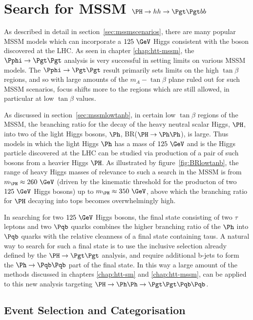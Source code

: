 \chapter{Search for MSSM $\PH \to hh \to \Pgt\Pgt bb$}
\label{chap:Hhh}

As described in detail in section~\ref{sec:mssmscenarios}, there are many popular
\ac{MSSM} models which can incorporate a $125~\GeV$ Higgs consistent with the boson
discovered at the LHC. As seen in chapter \ref{chap:htt-mssm}, the 
$\Pphi \to \Pgt\Pgt$ analysis is very successful in 
setting limits on various \ac{MSSM} models. The $\Pphi \to \Pgt \Pgt$ result primarily sets
limits on the high $\tan\beta$ regions, and so with large amounts of the
$m_{A}-\tan\beta$ plane ruled out for such \ac{MSSM} scenarios, focus shifts more 
to the regions which are still allowed, in particular at low $\tan\beta$ values.

As discussed in section~\ref{sec:mssmlowtanb}, in certain low $\tan\beta$ regions 
of the \ac{MSSM}, the branching ratio for the
decay of the heavy neutral scalar Higgs, $\PH$, into two of the light Higgs
bosons, $\Ph$, BR($\PH \to \Ph\Ph$), is large. Thus models in which the
light Higgs $\Ph$ has a mass of $125~\GeV$ and is the Higgs particle discovered at the
LHC can be studied via production of a pair of such bosons from a
heavier Higgs $\PH$. As illustrated by figure~\ref{fig:BRlowtanb}, the range of heavy 
Higgs masses of relevance to such a search in the \ac{MSSM} is from $m_{\PH}\approx260~\GeV$ 
(driven by the kinematic threshold for the producton of two $125~\GeV$ Higgs
bosons) up to $m_{\PH}\approx350~\GeV$, above which the branching ratio for 
$\PH$ decaying into tops becomes overwhelmingly high.

In searching for two $125~\GeV$ Higgs bosons, the final state consisting of two
$\tau$ leptons and two $\Pqb$ quarks combines the higher branching ratio of the
$\Ph$ into $\Pqb$ quarks with the relative cleanness of a final state containing
taus. A natural way to search for such a final state is to use the inclusive
selection already defined by the $\PH\to\Pgt\Pgt$ analysis, and require
additional b-jets to form the $\Ph\to\Pqb\Pqb$ part of the final state. 
In this way a large amount of the methods discussed in chapters 
\ref{chap:htt-sm} and \ref{chap:htt-mssm}, 
can be applied to this new analysis targeting $\PH \to \Ph\Ph \to \Pgt\Pgt
\Pqb\Pqb$.

\section{Event Selection and Categorisation}
\label{sec:HhhEventSelection}

